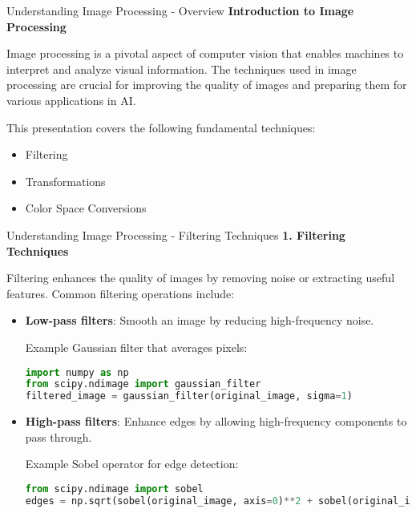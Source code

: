 \documentclass[aspectratio=169]{beamer}
\begin{document}
\begin{frame}[fragile]{Understanding Image Processing - Overview}
    \textbf{Introduction to Image Processing}
    
    Image processing is a pivotal aspect of computer vision that enables machines to interpret and analyze visual information. The techniques used in image processing are crucial for improving the quality of images and preparing them for various applications in AI.
    
    This presentation covers the following fundamental techniques:
    \begin{itemize}
        \item Filtering
        \item Transformations
        \item Color Space Conversions
    \end{itemize}
\end{frame}

\begin{frame}[fragile]{Understanding Image Processing - Filtering Techniques}
    \textbf{1. Filtering Techniques}
    
    Filtering enhances the quality of images by removing noise or extracting useful features. Common filtering operations include:
    
    \begin{itemize}
        \item \textbf{Low-pass filters}: Smooth an image by reducing high-frequency noise.
        \begin{block}{Example}
            Gaussian filter that averages pixels:
            \begin{lstlisting}[language=Python]
import numpy as np
from scipy.ndimage import gaussian_filter
filtered_image = gaussian_filter(original_image, sigma=1)
            \end{lstlisting}
        \end{block}
        
        \item \textbf{High-pass filters}: Enhance edges by allowing high-frequency components to pass through.
        \begin{block}{Example}
            Sobel operator for edge detection:
            \begin{lstlisting}[language=Python]
from scipy.ndimage import sobel
edges = np.sqrt(sobel(original_image, axis=0)**2 + sobel(original_image, axis=1)**2)
            \end{lstlisting}
        \end{block}
    \end{itemize}
\end{frame}
\end{document}
